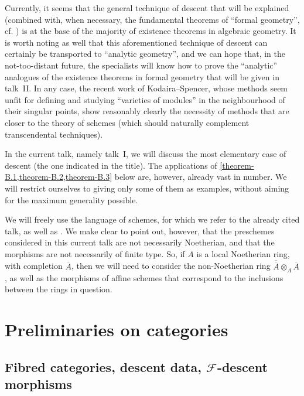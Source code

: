 \documentclass{article}
\theoremstyle{plain}
\theoremstyle{definition}
\newcommand{\sh}[1]{{\mathscr{#1}}}
\newcommand{\oldpage}[1]{\marginpar{\footnotesize$\Big\vert$ \textit{p.~#1}}}
\begin{document}
Currently, it seems that the general technique of descent that will be explained (combined with, when necessary, the fundamental theorems of ``formal geometry'', cf. \cite{3}) is at the base of the majority of existence theorems in algebraic geometry.
It is worth noting as well that this aforementioned technique of descent can certainly be transported to ``analytic geometry'', and we can hope that, in the not-too-distant future, the specialists will know how to prove the ``analytic'' analogues of the existence theorems in formal geometry that will be given in talk~II.
In any case, the recent work of Kodaira--Spencer, whose methods seem unfit for defining and studying ``varieties of modules'' in the neighbourhood of their singular points, show reasonably clearly the necessity of methods that are closer to the theory of schemes (which should naturally complement transcendental techniques).

In the current talk, namely talk~I, we will discuss the most elementary case of descent (the one indicated in the title).
The applications of \cref{theorem-B.1,theorem-B.2,theorem-B.3} below are, however, already vast in number.
We will restrict ourselves to giving only some of them as examples, without aiming for the maximum generality possible.

We will freely use the language of schemes, for which we refer to the already cited talk, as well as \cite{2}.
We make clear to point out, however, that the preschemes considered in this current talk are not necessarily Noetherian, and that the
\oldpage{190-02}
morphisms are not necessarily of finite type.
So, if $A$ is a local Noetherian ring, with completion $\overline{A}$, then we will need to consider the non-Noetherian ring $\overline{\overline{A}}\otimes_A\overline{A}$, as well as the morphisms of affine schemes that correspond to the inclusions between the rings in question.


\section{Preliminaries on categories}
\label{A}


\subsection{Fibred categories, descent data, \texorpdfstring{$\sh{F}$}{F}-descent morphisms}
\label{A.1}

\subsubsection{}
\label{A.1.a}
\end{document}

